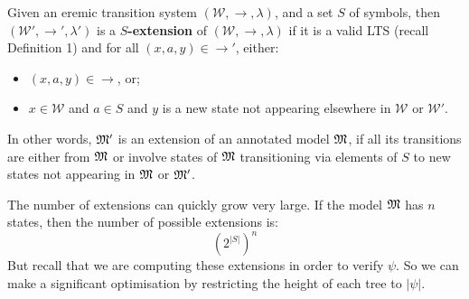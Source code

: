 \begin{definition}
Given an eremic transition system $(\mathcal{W},\rightarrow,\lambda)$,  and a set $S$ of symbols, then $(\mathcal{W'},\rightarrow',\lambda')$ is a {\bf $S$-extension} of $(\mathcal{W},\rightarrow,\lambda)$ if it is a valid LTS (recall Definition 1) and for all $(x,a,y) \in \rightarrow'$, either:
\begin{itemize} 
\item
$(x, a, y) \in \rightarrow$,  or;
\item
 $x \in \mathcal{W}$ and $a \in S$ and $y$ is a new state not appearing elsewhere in $\mathcal{W}$ or $\mathcal{W'}$.
\end{itemize}
\end{definition}
In other words, $\frak{M}'$ is an extension of an annotated model $\frak{M}$, if all its transitions are either from $\frak{M}$ or involve states of $\frak{M}$ transitioning via elements of $S$ to new states not appearing in $\frak{M}$ or $\frak{M}'$.

The number of extensions can quickly grow very large.
If the model $\frak{M}$ has $n$ states, then the number of possible extensions is:
\[
({2^{|S|}})^n
\] 
But recall that we are computing these extensions in order to verify $\psi$. So we can make a significant optimisation by restricting the height of each tree to $|\psi|$.

